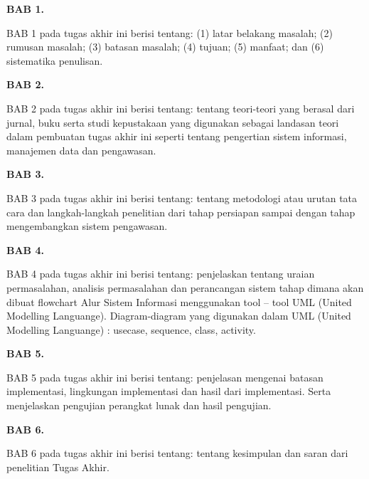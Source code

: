 \textbf{BAB 1. \babSatu}

BAB 1 pada tugas akhir ini berisi tentang: (1) latar belakang masalah; (2) rumusan masalah; (3) batasan masalah; (4) tujuan; (5) manfaat; dan (6) sistematika penulisan.

\textbf{BAB 2. \babDua}

BAB 2 pada tugas akhir ini berisi tentang: tentang teori-teori yang berasal dari jurnal, buku serta studi kepustakaan yang digunakan sebagai landasan teori dalam pembuatan tugas akhir ini seperti tentang pengertian sistem informasi, manajemen data dan pengawasan.


\textbf{BAB 3. \babTiga}

BAB 3 pada tugas akhir ini berisi tentang: tentang metodologi atau urutan tata cara dan langkah-langkah penelitian dari tahap persiapan sampai dengan tahap mengembangkan sistem pengawasan.


\textbf{BAB 4. \babEmpat}

BAB 4 pada tugas akhir ini berisi tentang: penjelaskan tentang uraian permasalahan, analisis permasalahan dan perancangan sistem tahap dimana akan dibuat flowchart Alur Sistem Informasi menggunakan tool – tool UML (United Modelling Languange). Diagram-diagram yang digunakan dalam UML (United Modelling Languange) : usecase, sequence, class, activity.

\textbf{BAB 5. \babLima}

BAB 5 pada tugas akhir ini berisi tentang: penjelasan mengenai batasan implementasi, lingkungan implementasi dan hasil dari implementasi. Serta menjelaskan pengujian perangkat lunak dan hasil pengujian.

\textbf{BAB 6. \babEnam}

BAB 6 pada tugas akhir ini berisi tentang: tentang kesimpulan dan saran dari penelitian Tugas Akhir.